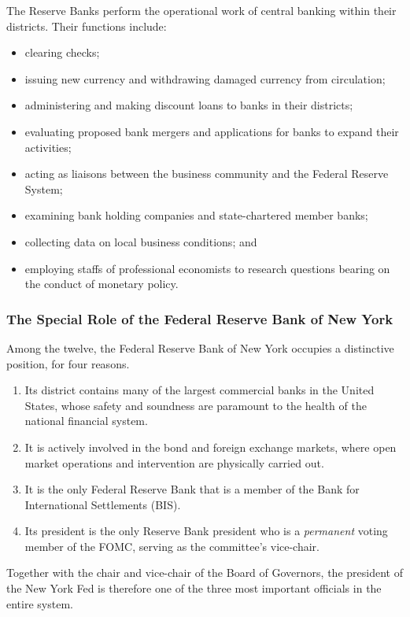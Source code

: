 The Reserve Banks perform the operational work of central banking within their districts. Their functions include:
\begin{itemize}
    \item clearing checks;
    \item issuing new currency and withdrawing damaged currency from circulation;
    \item administering and making discount loans to banks in their districts;
    \item evaluating proposed bank mergers and applications for banks to expand their activities;
    \item acting as liaisons between the business community and the Federal Reserve System;
    \item examining bank holding companies and state-chartered member banks;
    \item collecting data on local business conditions; and
    \item employing staffs of professional economists to research questions bearing on the conduct of monetary policy.
\end{itemize}

\subsubsection*{The Special Role of the Federal Reserve Bank of New York}

Among the twelve, the Federal Reserve Bank of New York occupies a distinctive position, for four reasons.

\begin{enumerate}
    \item Its district contains many of the largest commercial banks in the United States, whose safety and soundness are paramount to the health of the national financial system.
    \item It is actively involved in the bond and foreign exchange markets, where open market operations and intervention are physically carried out.
    \item It is the only Federal Reserve Bank that is a member of the Bank for International Settlements (BIS).
    \item Its president is the only Reserve Bank president who is a \emph{permanent} voting member of the FOMC, serving as the committee's vice-chair.
\end{enumerate}
Together with the chair and vice-chair of the Board of Governors, the president of the New York Fed is therefore one of the three most important officials in the entire system.

